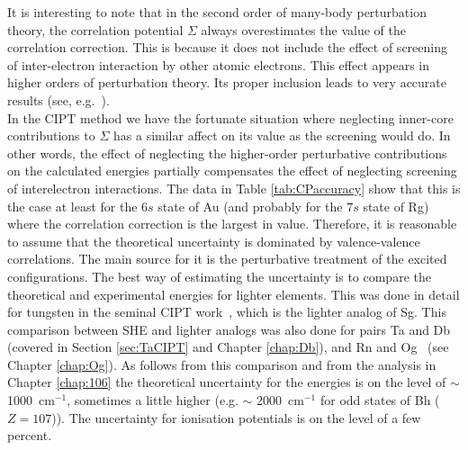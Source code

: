 \documentclass[10pt,a4paper, twoside, openright]{report}
\begin{document}
\linebreak
 It is interesting to note that in the second order of many-body perturbation theory, the correlation potential $\Sigma$ always overestimates the value of the correlation correction. This is because it does not include the effect of screening of inter-electron interaction by other atomic electrons. This effect appears in higher orders of perturbation theory. Its proper inclusion leads to very accurate results (see, e.g.~\cite{Dzuba1988, Dzuba2008}).\\
\linebreak   
In the CIPT method we have the fortunate situation where neglecting inner-core contributions to $\Sigma$ has a similar affect on its value as the screening would do. In other words, the effect of neglecting the higher-order perturbative contributions on
the calculated energies partially compensates the effect of neglecting
screening of interelectron interactions. The data in Table \ref{tab:CPaccuracy} show that this is the case at least for the
$6s$ state of Au (and probably for the $7s$ state of Rg) where the correlation correction
is the largest in value. Therefore, it is reasonable to assume that the theoretical uncertainty is dominated by valence-valence correlations. The main source for it is the perturbative treatment of the excited configurations. The best way of estimating the uncertainty is to compare the theoretical and experimental energies for lighter elements. This was done in detail for tungsten in the seminal CIPT work~\cite{DBHF2017}, which is the lighter analog of Sg.  This comparison between SHE and lighter analogs was also done for pairs Ta and Db~\cite{LDFDb2018} (covered in Section \ref{sec:TaCIPT} and Chapter \ref{chap:Db}), and Rn and Og~\cite{LDFOg2018} (see Chapter \ref{chap:Og}). As follows from this comparison and from the analysis in Chapter \ref{chap:106} the theoretical uncertainty for the energies is on the level of $\sim$ 1000~cm$^{-1}$, sometimes a little higher (e.g.  $\sim$ 2000~cm$^{-1}$ for odd states of Bh ($Z=107$)). The uncertainty for ionisation potentials is on the level of a few percent.
\end{document}
